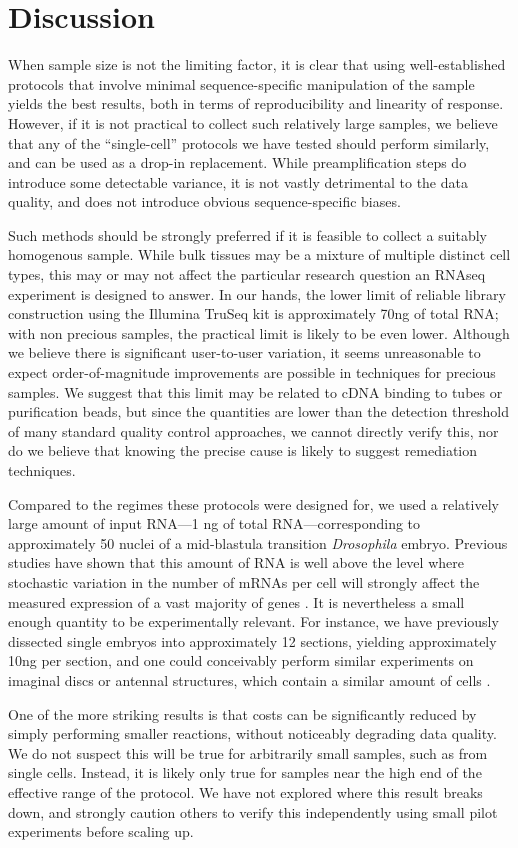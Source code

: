 \section{Discussion}


When sample size is not the limiting factor, it is clear that using well-established protocols that involve minimal sequence-specific manipulation of the sample yields the best results, both in terms of reproducibility and linearity of response. However, if it is not practical to collect such relatively large samples, we believe that any of the ``single-cell'' protocols we have tested should perform similarly, and can be used as a drop-in replacement. While preamplification steps do introduce some detectable variance, it is not vastly detrimental to the data quality, and does not introduce obvious sequence-specific biases.

Such methods should be strongly preferred if it is feasible to collect a suitably homogenous sample. While bulk tissues may be a mixture of multiple distinct cell types, this may or may not affect the particular research question an RNAseq experiment is designed to answer.  In our hands, the lower limit of reliable library construction using the Illumina TruSeq kit is approximately 70ng of total RNA; with non precious samples, the practical limit is likely to be even lower. Although we believe there is significant user-to-user variation, it seems unreasonable to expect order-of-magnitude improvements are possible in techniques for precious samples. We suggest that this limit may be related to cDNA binding to tubes or purification beads, but since the quantities are lower than the detection threshold of many standard quality control approaches, we cannot directly verify this, nor do we believe that knowing the precise cause is likely to suggest remediation techniques.


Compared to the regimes these protocols were designed for, we used a relatively large amount of input RNA---1 ng of total RNA---corresponding to approximately 50 nuclei of a mid-blastula transition {\em Drosophila} embryo. Previous studies have shown that this amount of RNA is well above the level where stochastic variation in the number of mRNAs per cell will strongly affect the measured expression of a vast majority of genes \cite{Marinov:2013fm}. It is nevertheless a small enough quantity to be experimentally relevant.  For instance, we have previously dissected single embryos into approximately 12 sections, yielding approximately 10ng per section\cite{Combs:2013jy}, and one could conceivably perform similar experiments on imaginal discs or antennal structures, which contain a similar amount of cells \cite{Klebes:2002ua,Hansson:2000cx}.

One of the more striking results is that costs can be significantly reduced by simply performing smaller reactions, without noticeably degrading data quality.  We do not suspect this will be true for arbitrarily small samples, such as from single cells.  Instead, it is likely only true for samples near the high end of the effective range of the protocol. We have not explored where this result breaks down, and strongly caution others to verify this independently using small pilot experiments before scaling up.
